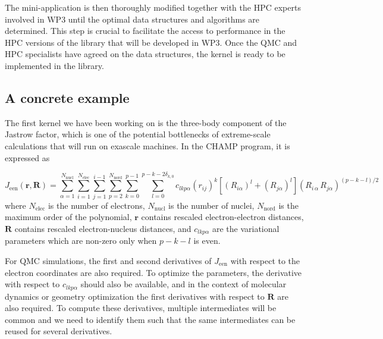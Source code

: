 The mini-application is then thoroughly modified together with the
\ac{HPC} experts involved in \ac{WP}3 until the optimal data
structures and algorithms are determined. This step is crucial to
facilitate the access to performance in the \ac{HPC} versions of the
library that will be developed in \ac{WP}3.  Once the \ac{QMC} and
\ac{HPC} specialists have agreed on the data structures, the kernel is
ready to be implemented in the
library.


\subsection{A concrete example}

The first kernel we have been working on is the three-body component of
the Jastrow factor, which is one of the potential bottlenecks of
extreme-scale calculations that will run on exascale machines.
In the CHAMP program, it is expressed as

\newcommand{\Jeen}{J_{\text{een}}}
\newcommand{\Nel}{N_{\text{elec}}}
\newcommand{\Nat}{N_{\text{nucl}}}
\newcommand{\Nord}{N_{\text{nord}}}
\newcommand{\lmax}{p-k-2\delta_{k,0}}
\newcommand{\br}{\mathbf{r}}
\newcommand{\bR}{\mathbf{R}}
\[
  \Jeen (\br,\bR) = \sum_{\alpha=1}^{\Nat} \sum_{i=1}^{\Nel} \sum_{j=1}^{i-1}
\sum_{p=2}^{\Nord} \sum_{k=0}^{p-1}
\sum_{l=0}^{\lmax} c_{lkp\alpha}
\left( {r}_{ij} \right)^k
\left[ \left( {R}_{i\alpha} \right)^l + \left( {R}_{j\alpha} \right)^l \right]
\left( {R}_{i\,\alpha} \, {R}_{j\alpha} \right)^{(p-k-l)/2} 
\]
where
$\Nel$ is the number of electrons, 
$\Nat$ is the number of nuclei,
$\Nord$ is the maximum order of the polynomial, 
$\br$ contains rescaled electron-electron distances, 
$\bR$ contains rescaled electron-nucleus distances,
and $c_{lkp\alpha}$ are the variational parameters which are non-zero
only when $p-k-l$ is even.

For \ac{QMC} simulations, the first and second derivatives of $\Jeen$ with
respect to the electron coordinates are also required. To optimize the
parameters, the derivative with respect to $c_{lkp\alpha}$
should also be available, and in the context of molecular dynamics or
geometry optimization the first derivatives with respect to $\bR$ are
also required. To compute these derivatives, multiple intermediates
will be common and we need to identify them such that the same
intermediates can be reused for several derivatives.

